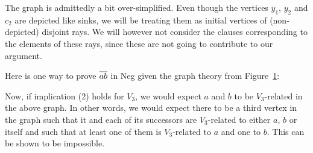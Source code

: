 The graph is admittedly a bit over-simplified.
Even though the vertices $y_1$, $y_2$ and $c_2$ are depicted like sinks, we will be treating them as initial vertices of (non-depicted) disjoint rays.
We will however not consider the clauses corresponding to the elements of these rays, since these are not going to contribute to our argument.
\begin{figure}[!h]
  \centering
  \caption{}
  \label{fig:v3_counter_graph}
\end{figure}
\FloatBarrier
Here is one way to prove $\ol{ab}$ in Neg given the graph theory from Figure~\ref{fig:v3_counter_graph}:\par
\begin{figure}[!h]
  \centering
  \begin{prooftree*}
  \end{prooftree*}
  \caption{}
  \label{fig:v3_counter_proof}
\end{figure}
\FloatBarrier
Now, if implication (2) holds for $V_3$, we would expect $a$ and $b$ to be $V_3$-related in the above graph.
In other words, we would expect there to be a third vertex in the graph such that it and each of its successors are $V_3$-related to either $a$, $b$ or itself and such that at least one of them is $V_3$-related to $a$ and one to $b$.
This can be shown to be impossible.

